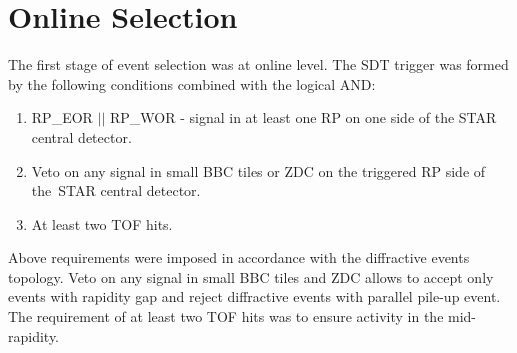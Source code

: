 \section{Online Selection}\label{section:star_trigger_selection}

The first stage of event selection was at online level. The SDT trigger was formed by the following conditions combined with the logical AND:
\begin{enumerate}
	\item RP\_EOR $||$ RP\_WOR - signal in at least one RP on one side of the STAR central detector.
	\item Veto on any signal in small BBC tiles or ZDC on the triggered RP  side of the~STAR central detector.
	\item At least two TOF hits.
\end{enumerate}


Above requirements were imposed in accordance with the diffractive events topology. Veto on any signal in small BBC tiles and ZDC allows to accept only events with rapidity gap and reject diffractive events with parallel pile-up event. The requirement of at least two TOF hits was to ensure activity in the mid-rapidity.